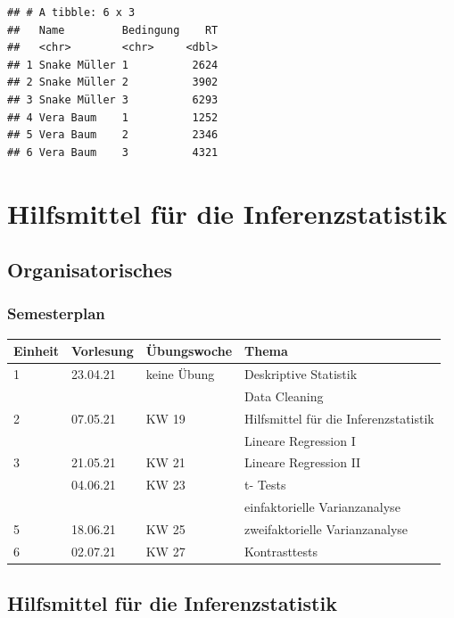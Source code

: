 \documentclass[
]{book}
\begin{document}
\begin{verbatim}
## # A tibble: 6 x 3
##   Name         Bedingung    RT
##   <chr>        <chr>     <dbl>
## 1 Snake Müller 1          2624
## 2 Snake Müller 2          3902
## 3 Snake Müller 3          6293
## 4 Vera Baum    1          1252
## 5 Vera Baum    2          2346
## 6 Vera Baum    3          4321
\end{verbatim}

\hypertarget{hilfsmittel-fuxfcr-die-inferenzstatistik}{%
\chapter{Hilfsmittel für die Inferenzstatistik}\label{hilfsmittel-fuxfcr-die-inferenzstatistik}}

\hypertarget{organisatorisches-1}{%
\section{Organisatorisches}\label{organisatorisches-1}}

\hypertarget{semesterplan-2}{%
\subsection{Semesterplan}\label{semesterplan-2}}

\begin{tabular}[t]{llll}
\toprule
Einheit & Vorlesung & Übungswoche & Thema\\
\midrule
1 & 23.04.21 & keine Übung & Deskriptive Statistik\\
 &  &  & Data Cleaning\\
2 & 07.05.21 & KW 19 & Hilfsmittel für die Inferenzstatistik\\
 &  &  & Lineare Regression I\\
3 & 21.05.21 & KW 21 & Lineare Regression II\\
\addlinespace
4 & 04.06.21 & KW 23 & t- Tests\\
 &  &  & einfaktorielle Varianzanalyse\\
5 & 18.06.21 & KW 25 & zweifaktorielle Varianzanalyse\\
6 & 02.07.21 & KW 27 & Kontrasttests\\
\bottomrule
\end{tabular}

\hypertarget{hilfsmittel-fuxfcr-die-inferenzstatistik-1}{%
\section{Hilfsmittel für die Inferenzstatistik}\label{hilfsmittel-fuxfcr-die-inferenzstatistik-1}}
\end{document}
